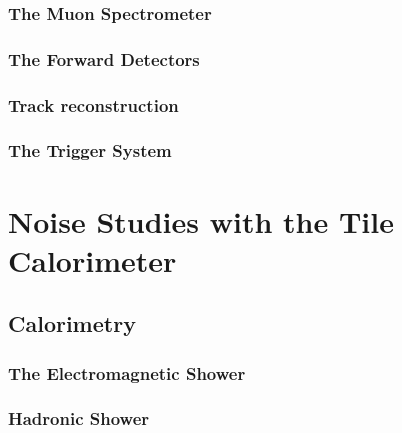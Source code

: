 \documentclass[10pt,twoside,cucitura,classica,english,openany]{toptesi}
\begin{document}


\subsection{The Muon Spectrometer}
\label{sec:muon-spectrometer}



\subsection{The Forward Detectors}
\label{sec:forward-detectors}



\subsection{Track reconstruction}
\label{sec:track-reconstruction}



\subsection{The Trigger System}
\label{sec:trigger-system}



\chapter{Noise Studies with the Tile Calorimeter}
\label{cha:noise-studies-with}

\section{Calorimetry}
\label{sec:calorimetry}



\subsection{The Electromagnetic Shower}
\label{sec:electr-show}



\subsection{Hadronic Shower}
\label{sec:hadronic-shower}
\end{document}
